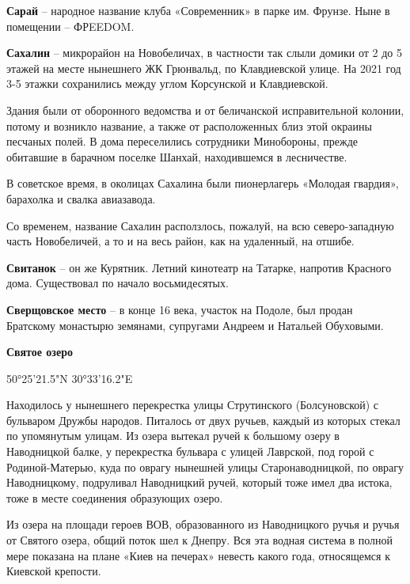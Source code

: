 \medskip

\textbf{Сарай} – народное название клуба «Современник» в парке им. Фрунзе. Ныне в помещении – ФРEEDOM.\\

\medskip

\textbf{Сахалин} – микрорайон на Новобеличах, в частности так слыли домики от 2 до 5 этажей на месте нынешнего ЖК Грюнвальд, по Клавдиевской улице. На 2021 год 3-5 этажки сохранились между углом Корсунской и Клавдиевской.

Здания были от оборонного ведомства и от беличанской исправительной колонии, потому и возникло название, а также от расположенных близ этой окраины песчаных полей. В дома переселились сотрудники Минобороны, прежде обитавшие в барачном поселке Шанхай, находившемся в лесничестве. 

В советское время, в околицах Сахалина были пионерлагерь «Молодая гвардия», барахолка и свалка авиазавода.

Со временем, название Сахалин расползлось, пожалуй, на всю северо-западную часть Новобеличей, а то и на весь район, как на удаленный, на отшибе.\\

\medskip

\textbf{Свитанок} – он же Курятник. Летний кинотеатр на Татарке, напротив Красного дома. Существовал по начало восьмидесятых.\\

\medskip

\textbf{Сверщовское место} – в конце 16 века, участок на Подоле, был продан Братскому монастырю земянами, супругами Андреем и Натальей Обуховыми.\\

\medskip

\textbf{Святое озеро}

50°25'21.5"N 30°33'16.2"E

Находилось у нынешнего  перекрестка улицы Струтинского (Болсуновской) с бульваром Дружбы народов. Питалось от двух ручьев, каждый из которых стекал по упомянутым улицам. Из озера вытекал ручей к большому озеру в Наводницкой балке, у перекрестка бульвара с улицей Лаврской, под горой с Родиной-Матерью, куда по оврагу нынешней улицы Старонаводницкой, по оврагу Наводницкому, подруливал Наводницкий ручей, который тоже имел два истока, тоже в месте соединения образующих озеро. 

Из озера на площади героев ВОВ, образованного из Наводницкого ручья и ручья от Святого озера, общий поток шел к Днепру. Вся эта водная система в полной мере показана на плане «Киев на печерах» невесть какого года, относящемся к Киевской крепости.\\

